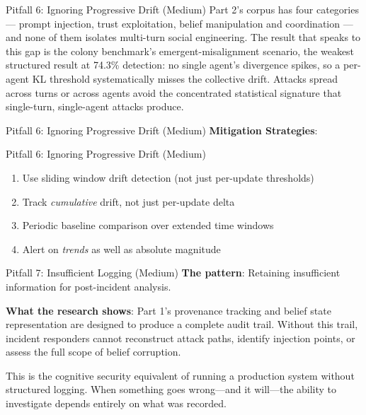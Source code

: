 \documentclass[
  ignorenonframetext,
]{beamer}
\newcounter{none} %
\providecommand{\tightlist}{%
  \setlength{\itemsep}{0pt}\setlength{\parskip}{0pt}}
\begin{document}
\begin{frame}[allowframebreaks]{Pitfall 6: Ignoring Progressive Drift
(Medium)}
Part 2's corpus has four categories --- prompt injection, trust
exploitation, belief manipulation and coordination --- and none of them
isolates multi-turn social engineering. The result that speaks to this
gap is the colony benchmark's emergent-misalignment scenario, the
weakest structured result at 74.3\% detection: no single agent's
divergence spikes, so a per-agent KL threshold systematically misses the
collective drift. Attacks spread across turns or across agents avoid the
concentrated statistical signature that single-turn, single-agent
attacks produce.

\end{frame}

\begin{frame}[allowframebreaks]{Pitfall 6: Ignoring Progressive Drift
(Medium)}
\textbf{Mitigation Strategies}:

\end{frame}

\begin{frame}[allowframebreaks]{Pitfall 6: Ignoring Progressive Drift
(Medium)}
\begin{enumerate}
\tightlist
\item
  Use sliding window drift detection (not just per-update thresholds)
\item
  Track \emph{cumulative} drift, not just per-update delta
\item
  Periodic baseline comparison over extended time windows
\item
  Alert on \emph{trends} as well as absolute magnitude
\end{enumerate}
\end{frame}

\begin{frame}[allowframebreaks]{Pitfall 7: Insufficient Logging
(Medium)}
\protect{}\label{pitfall-7-insufficient-logging-medium}
\textbf{The pattern}: Retaining insufficient information for
post-incident analysis.

\textbf{What the research shows}: Part 1's provenance tracking and
belief state representation are designed to produce a complete audit
trail. Without this trail, incident responders cannot reconstruct attack
paths, identify injection points, or assess the full scope of belief
corruption.

This is the cognitive security equivalent of running a production system
without structured logging. When something goes wrong---and it
will---the ability to investigate depends entirely on what was recorded.

\end{frame}
\end{document}
